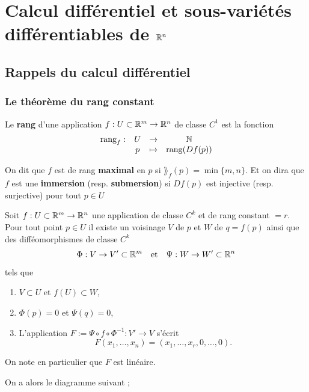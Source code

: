 \chapter{Calcul différentiel et sous-variétés différentiables de $\mathbb{R}^n$}

\section{Rappels du calcul différentiel}
\subsection{Le théorème du rang constant}
\begin{definition}
	Le \textbf{rang} d'une application $f : U \subset \mathbb{R}^m \to \mathbb{R}^n$ de classe $C^1$ est la fonction
	\[
	\begin{array}{cccc}
		\operatorname{rang}_f : & U & \to & \mathbb{N} \\ & p & \mapsto & \operatorname{rang}(Df(p))
	\end{array}
	\]
\end{definition}

\begin{remarque}
	On dit que $f$ est de rang \textbf{maximal} en $p$ si $\rang_f(p) = \min\{m,n\}$. Et on dira que $f$ est une \textbf{immersion} (resp. \textbf{submersion}) si $Df(p)$ est injective (resp. surjective) pour tout $p \in U$ 
\end{remarque}

\begin{theoreme}
	Soit $f : U \subset \mathbb{R}^m \to \mathbb{R}^n$ une application de classe $C^k$ et de rang constant $= r$. Pour tout point $p \in U$ il existe un voisinage $V$ de $p$ et $W$ de $q = f(p)$ ainsi que des difféomorphismes de classe $C^k$
	\[
	\Phi : V \to V' \subset \mathbb{R}^m \quad \text{et} \quad \Psi : W \to W' \subset \mathbb{R}^n
	\]
	tels que
	\begin{enumerate}
		\item $V \subset U$ et $f(U) \subset W$,
		\item $\Phi(p) = 0$ et $\Psi(q) = 0$,
		\item L'application $F := \Psi \circ f \circ \Phi^{-1} : V' \to V$ s'écrit
		\[
		F(x_1, \ldots, x_n) = (x_1, \ldots, x_r, 0, \ldots, 0).
		\]
	\end{enumerate}
	On note en particulier que $F$ est linéaire.
\end{theoreme}
On a alors le diagramme suivant ;
\begin{figure}[H]
	\centering
\end{figure}


